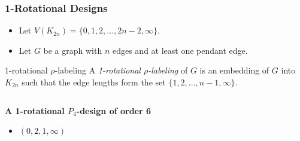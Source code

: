 \documentclass[11pt,serif,professionalfont,aspectratio=169]{beamer}
\newcommand{\vertex}{\node[vertex]}
\theoremstyle{plain}
\begin{document}
\begin{frame}
\frametitle{1-Rotational Designs}
\begin{itemize}
\item Let $V(K_{2n})=\{0,1,2,...,2n-2,\infty\}.$\\

\item Let $G$ be a graph with $n$ edges and at least one pendant edge.
\end{itemize}

\begin{block}{1-rotational $\rho$-labeling}
A \emph{1-rotational $\rho$-labeling} of $G$ is an embedding of $G$ into $K_{2n}$ such that the edge lengths form the set $\{1,2,...,n-1,\infty\}.$
\end{block}

\begin{columns}[T] %
\begin{column}{.48\textwidth}
\textbf{A 1-rotational $P_{4}$-design of order 6}
\begin{itemize}
\item \color{black} $(0,2,1,\infty)$ 

\end{itemize}
\end{column}%
\hfill%
\begin{column}{.48\textwidth}
\begin{center}

\end{center}
\end{column}%
\end{columns}

\end{frame}
\end{document}
